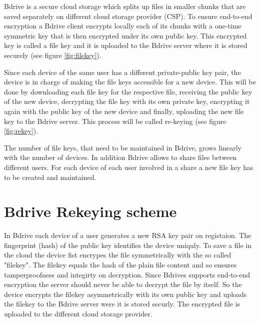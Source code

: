 Bdrive is a secure cloud storage which splits up files in smaller chunks that are saved separately on different cloud storage provider (CSP). To ensure end-to-end encryption a Bdrive client encrypts locally each of its chunks with a one-time symmetric key that is then encrypted under its own public key. This encrypted key is called a file key and it is uploaded to the Bdrive server where it is stored securely (see figure \ref{fig:filekey}).

Since each device of the same user has a different private-public key pair, the device is in charge of making the file keys accessible for a new device. This will be done by downloading each file key for the respective file, receiving the public key of the new device, decrypting the file key with its own private key, encrypting it again with the public key of the new device and finally, uploading the new file key to the Bdrive server. This process will be called re-keying (see figure \ref{fig:rekey}).

The number of file keys, that need to be maintained in Bdrive, grows linearly with the number of devices. In addition Bdrive allows to share files between different users. For each device of each user involved in a share a new file key has to be created and maintained. 




\section{Bdrive Rekeying scheme}

In Bdrive each device of a user generates a new RSA key pair on registaion. The fingerprint (hash) of the public key identifies the device uniquly. To save a file in the cloud the device fist encrypes the file symmetrically with the so called "filekey". The filekey equals the hash of the plain file content and so ensures tamperproofness and integirty on decryption. Since Bdrives supports end-to-end encryption the server should never be able to decrypt the file by itself. So the device encrypts the filekey asymmetrically with its own public key and uploads the filekey to the Bdrive server were it is stored securly. The encrypted file is uploaded to the different cloud storage provider. 

